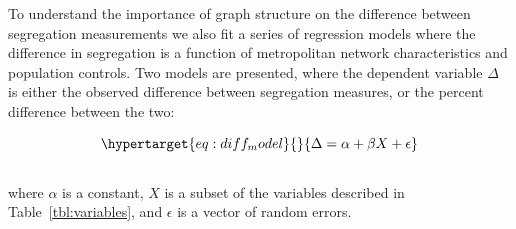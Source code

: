 \documentclass[
  10pt,
]{article}
\begin{document}
To understand the importance of graph structure on the difference
between segregation measurements we also fit a series of regression
models where the difference in segregation is a function of metropolitan
network characteristics and population controls. Two models are
presented, where the dependent variable \(\Delta\) is either the
observed difference between segregation measures, or the percent
difference between the two:

\begin{equation}\protect\hypertarget{eq:diff_model}{}{
\Delta = \alpha + \beta X + \epsilon
}\label{eq:diff_model}\end{equation}\\
where \(\alpha\) is a constant, \(X\) is a subset of the variables
described in Table~\ref{tbl:variables}, and \(\epsilon\) is a vector of
random errors.
\end{document}
